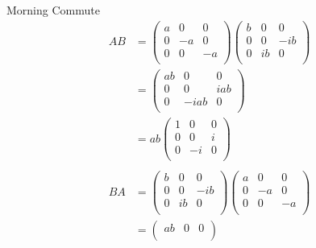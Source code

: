 \begin{answer}
\begin{answerpart}{Morning Commute}
    \begin{equation}
      \begin{split}
        AB
        &=
        \begin{pmatrix}
          a & 0 & 0\\
          0 & -a & 0\\
          0 & 0 & -a\\
        \end{pmatrix}
        \begin{pmatrix}
          b & 0 & 0\\
          0 & 0 & -ib\\
          0 & ib & 0\\
        \end{pmatrix}
        \\
        &= \begin{pmatrix}
          ab & 0 & 0\\
          0 & 0 & iab\\
          0 & -iab & 0\\
        \end{pmatrix}
        \\
        &= ab\begin{pmatrix}
          1 & 0 & 0\\
          0 & 0 & i\\
          0 & -i & 0\\
        \end{pmatrix}
        \\
      \end{split}
    \end{equation}
    \begin{equation}
      \begin{split}
        BA
        &=
        \begin{pmatrix}
          b & 0 & 0\\
          0 & 0 & -ib\\
          0 & ib & 0\\
        \end{pmatrix}
        \begin{pmatrix}
          a & 0 & 0\\
          0 & -a & 0\\
          0 & 0 & -a\\
        \end{pmatrix}
        \\
        &= \begin{pmatrix}
          ab & 0 & 0\\

\end{pmatrix}
\end{split}
\end{equation}
\end{answerpart}
\end{answer}
